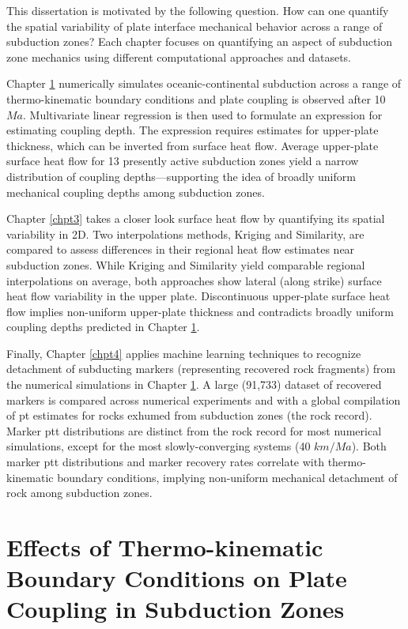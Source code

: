 This dissertation is motivated by the following question. How can one quantify the spatial variability of plate interface mechanical behavior across a range of subduction zones? Each chapter focuses on quantifying an aspect of subduction zone mechanics using different computational approaches and datasets.

Chapter \ref{chpt2} numerically simulates oceanic-continental subduction across a range of thermo-kinematic boundary conditions and plate coupling is observed after 10 \(Ma\). Multivariate linear regression is then used to formulate an expression for estimating coupling depth. The expression requires estimates for upper-plate thickness, which can be inverted from surface heat flow. Average upper-plate surface heat flow for 13 presently active subduction zones yield a narrow distribution of coupling depths---supporting the idea of broadly uniform mechanical coupling depths among subduction zones.

Chapter \ref{chpt3} takes a closer look surface heat flow by quantifying its spatial variability in 2D. Two interpolations methods, Kriging and Similarity, are compared to assess differences in their regional heat flow estimates near subduction zones. While Kriging and Similarity yield comparable regional interpolations on average, both approaches show lateral (along strike) surface heat flow variability in the upper plate. Discontinuous upper-plate surface heat flow implies non-uniform upper-plate thickness and contradicts broadly uniform coupling depths predicted in Chapter \ref{chpt2}.

Finally, Chapter \ref{chpt4} applies machine learning techniques to recognize detachment of subducting markers (representing recovered rock fragments) from the numerical simulations in Chapter \ref{chpt2}. A large (91,733)  dataset of recovered markers is compared across numerical experiments and with a global compilation of \gls{pt} estimates for rocks exhumed from subduction zones (the rock record). Marker \gls{ptt} distributions are distinct from the rock record for most numerical simulations, except for the most slowly-converging systems (40 \(km/Ma\)). Both marker \gls{ptt} distributions and marker recovery rates correlate with thermo-kinematic boundary conditions, implying non-uniform mechanical detachment of rock among subduction zones.

\cleardoublepage

\hypertarget{chpt2}{%
\chapter{Effects of Thermo-kinematic Boundary Conditions on Plate Coupling in Subduction Zones}\label{chpt2}}


